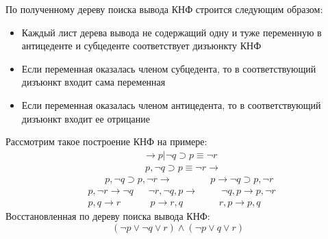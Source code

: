 \documentclass[a4paper,12pt]{article}
\begin{document}
\begin{Solution}
По полученному дереву поиска вывода КНФ строится следующим образом:
\begin{itemize}
\item Каждый лист дерева вывода не содержащий одну и туже переменную в антицеденте и субцеденте соответствует дизъюнкту КНФ

\item Если переменная оказалась членом субцедента, то в соответствующий дизъюнкт входит сама переменная

\item Если переменная оказалась членом антицедента, то в соответствующий дизъюнкт входит ее отрицание
\end{itemize}

Рассмотрим такое построение КНФ на примере:
\[
	\begin{split}
		& ~~~~~~~~~~~~~~~~~~~~~~~~~~\rightarrow p | \neg q \supset p \equiv \neg r \\
		& ~~~~~~~~~~~~~~~~~~~~~~~~~~~p, \neg q \supset p \equiv \neg r \rightarrow \\
		& ~~~~~~~~p, \neg q \supset p, \neg r \rightarrow ~~~~~~~~~~~~~~~~~~ p \rightarrow \neg q \supset p, \neg r \\
		& p, \neg r \rightarrow \neg q ~~~~~~~ \neg r,\neg q,p \rightarrow ~~~~~~~~~~~ \neg q, p \rightarrow p, \neg r \\
		& p,q \rightarrow r ~~~~~~~~~~~~~~ p \rightarrow r,q ~~~~~~~~~~~~~~~~~ r,p \rightarrow p,q
	\end{split}
\]
Восстановленная по дереву поиска вывода КНФ:
\[
	\left(\neg p \lor \neg q \lor r\right)\land\left(\neg p \lor q \lor r\right)
\]
\end{Solution}
\end{document}
